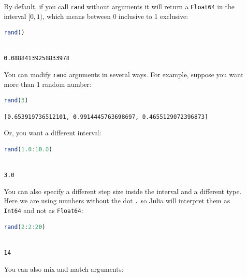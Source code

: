 \documentclass[
  notoc %
]{tufte-book}
\newcommand{\passthrough}[1]{#1}
\begin{document}
By default, if you call \passthrough{\lstinline!rand!} without arguments
it will return a \passthrough{\lstinline!Float64!} in the interval
\([0, 1)\), which means between 0 inclusive to 1 exclusive:

\begin{lstlisting}[language=Julia]
rand()
\end{lstlisting}

\begin{lstlisting}[language=Output]

0.08884139258833978

\end{lstlisting}

You can modify \passthrough{\lstinline!rand!} arguments in several ways.
For example, suppose you want more than 1 random number:

\begin{lstlisting}[language=Julia]
rand(3)
\end{lstlisting}

\begin{lstlisting}[language=Output]
[0.653919736512101, 0.9914445763698697, 0.4655129072396873]
\end{lstlisting}

Or, you want a different interval:

\begin{lstlisting}[language=Julia]
rand(1.0:10.0)
\end{lstlisting}

\begin{lstlisting}[language=Output]

3.0

\end{lstlisting}

You can also specify a different step size inside the interval and a
different type. Here we are using numbers without the dot
\passthrough{\lstinline!.!} so Julia will interpret them as
\passthrough{\lstinline!Int64!} and not as
\passthrough{\lstinline!Float64!}:

\begin{lstlisting}[language=Julia]
rand(2:2:20)
\end{lstlisting}

\begin{lstlisting}[language=Output]

14

\end{lstlisting}

You can also mix and match arguments:
\end{document}
